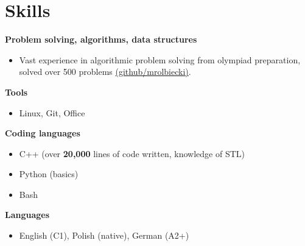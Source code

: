 \renewcommand{\subsection}[1]{
    \noindent\textbf{#1}
}
\section{Skills}
\subsection{Problem solving, algorithms, data structures}{}{}
\begin{itemize}
    \item Vast experience in algorithmic problem solving from olympiad preparation, solved over 500 problems \href{https://github.com/mrolbiecki/}{(github/mrolbiecki)}.

\end{itemize}

\subsection{Tools}{}{}
\begin{itemize}
    \item Linux, Git, Office
\end{itemize}

\subsection{Coding languages}{}{}
\begin{itemize}
    \item C++ (over \textbf{20,000} lines of code written, knowledge of STL)
    \item Python (basics)
    \item Bash
\end{itemize}

\subsection{Languages}{}{}
\begin{itemize}
    \item English (C1), Polish (native), German (A2+)
\end{itemize}